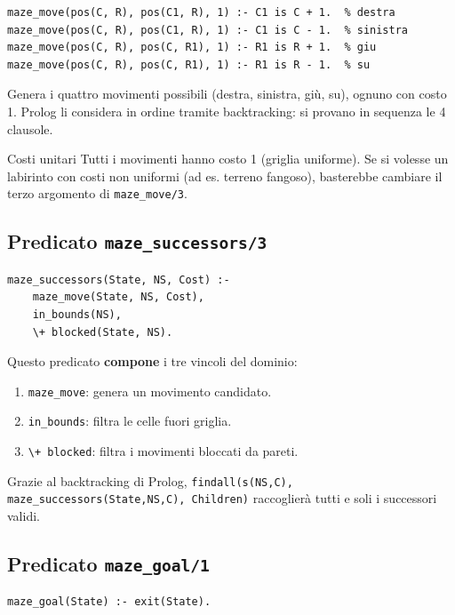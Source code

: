 \documentclass[12pt,a4paper]{article}
\begin{document}
\begin{lstlisting}
maze_move(pos(C, R), pos(C1, R), 1) :- C1 is C + 1.  % destra
maze_move(pos(C, R), pos(C1, R), 1) :- C1 is C - 1.  % sinistra
maze_move(pos(C, R), pos(C, R1), 1) :- R1 is R + 1.  % giu
maze_move(pos(C, R), pos(C, R1), 1) :- R1 is R - 1.  % su
\end{lstlisting}

Genera i quattro movimenti possibili (destra, sinistra, giù, su), ognuno con
costo 1. Prolog li considera in ordine tramite backtracking: si provano in
sequenza le 4 clausole.

\begin{warnbox}{Costi unitari}
Tutti i movimenti hanno costo 1 (griglia uniforme). Se si volesse un labirinto
con costi non uniformi (ad es. terreno fangoso), basterebbe cambiare il terzo
argomento di \texttt{maze\_move/3}.
\end{warnbox}

\subsection{Predicato \texttt{maze\_successors/3}}

\begin{lstlisting}
maze_successors(State, NS, Cost) :-
    maze_move(State, NS, Cost),
    in_bounds(NS),
    \+ blocked(State, NS).
\end{lstlisting}

Questo predicato \textbf{compone} i tre vincoli del dominio:
\begin{enumerate}[noitemsep]
  \item \texttt{maze\_move}: genera un movimento candidato.
  \item \texttt{in\_bounds}: filtra le celle fuori griglia.
  \item \texttt{\textbackslash+ blocked}: filtra i movimenti bloccati da pareti.
\end{enumerate}

Grazie al backtracking di Prolog, \texttt{findall(s(NS,C), maze\_successors(State,NS,C), Children)}
raccoglierà tutti e soli i successori validi.

\subsection{Predicato \texttt{maze\_goal/1}}

\begin{lstlisting}
maze_goal(State) :- exit(State).
\end{lstlisting}
\end{document}
